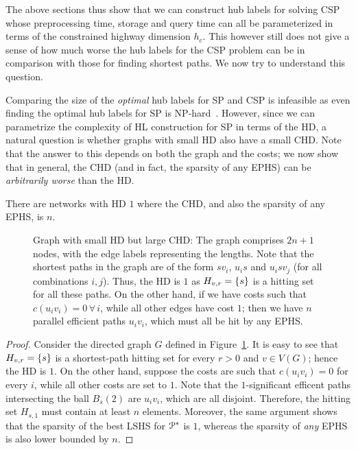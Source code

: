 The above sections thus show that we can construct hub labels for solving CSP whose preprocessing time, storage and query time can all be parameterized in terms of the constrained highway dimension $h_c$. 
This however still does not give a sense of how much worse the hub labels for the CSP problem can be in comparison with those for finding shortest paths. 
We now try to understand this question.

Comparing the size of the \emph{optimal} hub labels for SP and CSP is infeasible as even finding the optimal hub labels for SP is NP-hard~\cite{babenko_hl_complexity}. However, since we can parametrize the complexity of HL construction for SP in terms of the HD, a natural question is whether graphs with small HD also have a small CHD. Note that the answer to this depends on both the graph and the costs; we now show that in general, the CHD (and in fact, the sparsity of any EPHS) can be \emph{arbitrarily worse} than the HD. 
\begin{proposition}
There are networks with HD $1$ where the CHD, and also the sparsity of any EPHS, is $n$.
\end{proposition}

\begin{figure}

\caption{Graph with small HD but large CHD: The graph comprises $2n+1$ nodes, with the edge labels representing the lengths. Note that the shortest paths in the graph are of the form $sv_i$, $u_is$ and $u_isv_j$ (for all combinations $i,j$). Thus, the HD is $1$ as $H_{v,r}=\{s\}$ is a hitting set for all these paths. On the other hand, if we have costs such that $c(u_iv_i)=0\,\forall\,i$, while all other edges have cost $1$; then we have $n$ parallel efficient paths $u_iv_i$, which must all be hit by any EPHS.}
\label{fig:big_chd}
\end{figure}

\begin{proof}
Consider the directed graph $G$ defined in Figure~\ref{fig:big_chd}.
It is easy to see that $H_{v,r}=\{s\}$ is a shortest-path hitting set for every $r>0$ and $v\in V(G)$; hence the HD is $1$.
On the other hand, suppose the costs are such that $c(u_iv_i)=0$ for every $i$, while all other costs are set to $1$.
Note that the $1$-significant efficent paths intersecting the ball $B_s(2)$ are $u_iv_i$, which are all disjoint.
Therefore, the hitting set $H_{s,1}$ must contain at least $n$ elements. Moreover, the same argument shows that the sparsity of the best LSHS for $\mathcal{P}^*$ is $1$, whereas the sparsity of \emph{any} EPHS is also lower bounded by $n$.
\end{proof}

